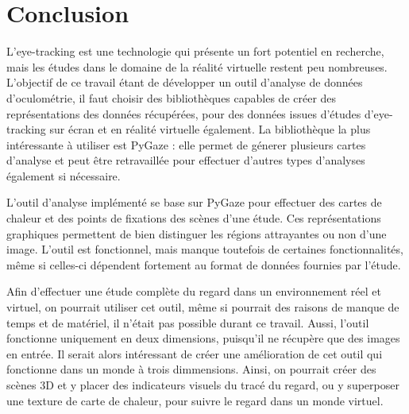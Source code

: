 \documentclass[hidelinks,12pt]{article}
\begin{document}

\section{Conclusion}

L'eye-tracking est une technologie qui présente un fort potentiel en recherche,
mais les études dans le domaine de la réalité virtuelle restent peu nombreuses.
L'objectif de ce travail étant de développer un outil d'analyse de données
d'oculométrie, il faut choisir des bibliothèques capables de créer des
représentations des données récupérées, pour des données issues d'études
d'eye-tracking sur écran et en réalité virtuelle également. La bibliothèque la
plus intéressante à utiliser est PyGaze : elle permet de génerer plusieurs
cartes d'analyse et peut être retravaillée pour effectuer d'autres types
d'analyses également si nécessaire.

\bigskip
L'outil d'analyse implémenté se base sur PyGaze pour effectuer des cartes de
chaleur et des points de fixations des scènes d'une étude. Ces représentations
graphiques permettent de bien distinguer les régions attrayantes ou non d'une
image. L'outil est fonctionnel, mais manque toutefois de certaines
fonctionnalités, même si celles-ci dépendent fortement au format de données 
fournies par l'étude.

\bigskip
Afin d'effectuer une étude complète du regard dans un environnement réel et
virtuel, on pourrait utiliser cet outil, même si pourrait des raisons de manque
de temps et de matériel, il n'était pas possible durant ce travail. Aussi,
l'outil fonctionne uniquement en deux dimensions, puisqu'il ne récupère que des
images en entrée. Il serait alors intéressant de créer une amélioration de cet
outil qui fonctionne dans un monde à trois dimmensions. Ainsi, on pourrait créer
des scènes 3D et y placer des indicateurs visuels du tracé du regard, ou y 
superposer une texture de carte de chaleur, pour suivre le regard dans un monde
virtuel.




\end{document}
